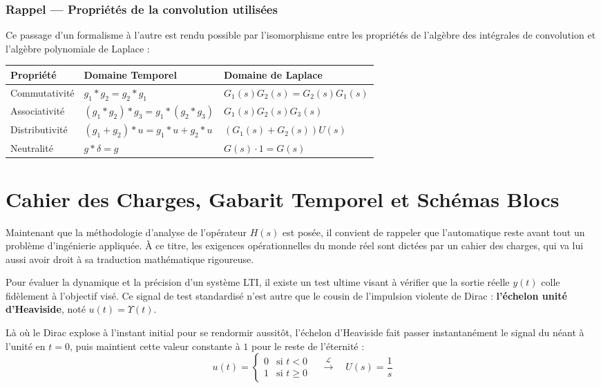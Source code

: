 \documentclass[11pt,a4paper]{report}
\begin{document}
\subsubsection{Rappel — Propriétés de la convolution utilisées}

Ce passage d'un formalisme à l'autre est rendu possible par l'isomorphisme entre les propriétés de l'algèbre des intégrales de convolution et l'algèbre polynomiale de Laplace :

\begin{center}
\renewcommand{\arraystretch}{1.5}
\begin{tabular}{lll}
  \hline
  \textbf{Propriété} & \textbf{Domaine Temporel} & \textbf{Domaine de Laplace} \\
  \hline
  Commutativité   & $g_1 * g_2 = g_2 * g_1$                     & $G_1(s) G_2(s) = G_2(s) G_1(s)$ \\
  Associativité   & $(g_1 * g_2) * g_3 = g_1 * (g_2 * g_3)$   & $G_1(s) G_2(s) G_3(s)$ \\
  Distributivité  & $(g_1 + g_2) * u = g_1{*}u + g_2{*}u$       & $(G_1(s)+G_2(s))U(s)$ \\
  Neutralité      & $g * \delta = g$                            & $G(s)\cdot 1 = G(s)$ \\
  \hline
\end{tabular}
\end{center}

\section{Cahier des Charges, Gabarit Temporel et Schémas Blocs}

Maintenant que la méthodologie d'analyse de l'opérateur $H(s)$ est posée, il convient de rappeler que l'automatique reste avant tout un problème d'ingénierie appliquée. À ce titre, les exigences opérationnelles du monde réel sont dictées par un cahier des charges, qui va lui aussi avoir droit à sa traduction mathématique rigoureuse. 

Pour évaluer la dynamique et la précision d'un système LTI, il existe un test ultime visant à vérifier que la sortie réelle $y(t)$ colle fidèlement à l'objectif visé. Ce signal de test standardisé n'est autre que le cousin de l'impulsion violente de Dirac : \textbf{l'échelon unité d'Heaviside}, noté $u(t) = \Upsilon(t)$. 



Là où le Dirac explose à l'instant initial pour se rendormir aussitôt, l'échelon d'Heaviside fait passer instantanément le signal du néant à l'unité en $t=0$, puis maintient cette valeur constante à $1$ pour le reste de l'éternité :
\[ u(t) = \begin{cases} 0 & \text{si } t < 0 \\ 1 & \text{si } t \ge 0 \end{cases} \quad \xrightarrow{\mathcal{L}} \quad U(s) = \frac{1}{s} \]
\end{document}
